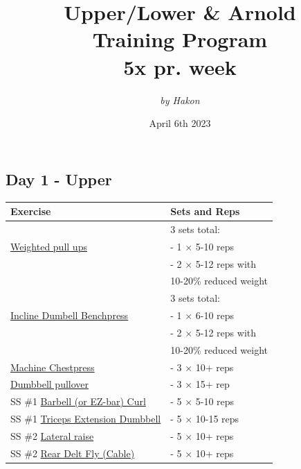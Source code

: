 \documentclass[11pt]{article}
\title{\Huge Upper/Lower \& Arnold  \\ Training Program \\ \large 5x pr. week}
\date{April 6th 2023}
\author{\textit{by Hakon}}
\begin{document}
\maketitle
\subsection*{Day 1 - Upper}
\begin{center}
\begin{tabular}{|l|l|}
\hline
\textbf{Exercise} & \textbf{Sets and Reps}\\
\hline
&  3 sets total: \\
\href{https://www.youtube.com/watch?v=eGo4IYlbE5g}{Weighted pull ups} & - 1 $\times$ 5-10 reps \\ 
& - 2  $\times$ 5-12 reps with \\ 
& 10-20\% reduced weight \\ 
\hline
& 3 sets total: \\
\href{https://www.youtube.com/watch?v=0f6-uCUKqgA}{Incline Dumbell Benchpress} & - 1  $\times$ 6-10 reps \\
& - 2  $\times$ 5-12 reps with \\
& 10-20\% reduced weight \\
\hline
\href{https://www.youtube.com/watch?v=dQw4w9WgXcQ}{Machine Chestpress} & - 3 $\times$ 10+ reps \\
\hline
\href{https://www.youtube.com/watch?v=FK4rHfWKEac}{Dumbbell pullover} & - 3 $\times$ 15+ rep\\
\hline
SS \#1  \href{https://www.youtube.com/watch?v=bAWLx7PPK10}{Barbell (or EZ-bar) Curl} & - 5 $\times$ 5-10 reps \\
SS \#1 \href{https://www.youtube.com/watch?v=_gsUck-7M74}{Triceps Extension Dumbbell} & - 5 $\times$ 10-15 reps \\ 
\hline
SS \#2 \href{https://www.youtube.com/watch?v=n5dsI9qQXwY}{Lateral raise} & - 5 $\times$ 10+ reps\\
SS \#2 \href{https://www.youtube.com/watch?v=JENKmsEZQO8}{Rear Delt Fly (Cable)} & - 5 $\times$ 10+ reps\\
\hline
\end{tabular}
\end{center}
\end{document}
